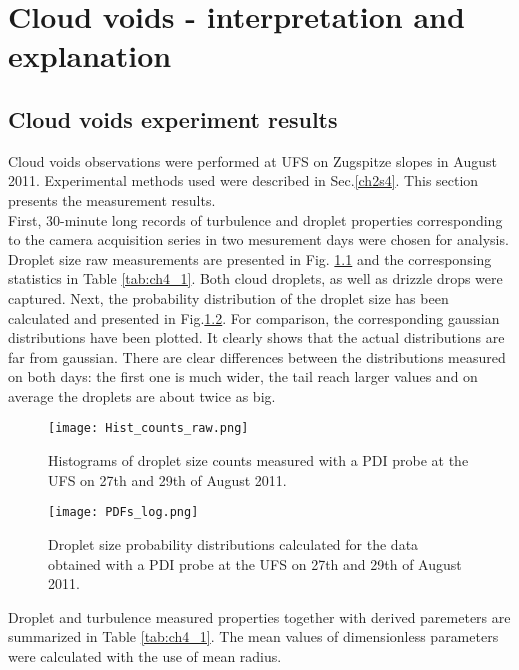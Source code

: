 \documentclass[../main.tex]{subfiles}
\begin{document}
\chapter{Cloud voids - interpretation and explanation} %

\label{ch:holes} %

\section{Cloud voids experiment results}
Cloud voids observations were performed at UFS on Zugspitze slopes in August 2011. Experimental methods used were described in Sec.\autoref{ch2s4}. This section presents the measurement results.\\
First, 30-minute long records of turbulence and droplet properties corresponding to the camera acquisition series in two mesurement days were chosen for analysis. Droplet size raw measurements are presented in Fig. \ref{fig:ch4_1} and the corresponsing statistics in Table \ref{tab:ch4_1}. Both cloud droplets, as well as drizzle drops were captured. Next, the probability distribution of the droplet size has been calculated and presented in Fig.\ref{fig:ch4_2}. For comparison, the corresponding gaussian distributions have been plotted. It clearly shows that the actual distributions are far from gaussian. There are clear differences between the distributions measured on both days: the first one is much wider, the tail reach larger values and on average the droplets are about twice as big.

\begin{figure}[h]
\centering
\noindent\texttt{[image: Hist\_counts\_raw.png]}
\caption{Histograms of droplet size counts measured with a PDI probe at the UFS on 27th and 29th of August 2011.}
\label{fig:ch4_1}
\end{figure}

\begin{figure}[h]
\centering
\noindent\texttt{[image: PDFs\_log.png]}
\caption{Droplet size probability distributions calculated for the data obtained with a PDI probe at the UFS on 27th and 29th of August 2011.}
\label{fig:ch4_2}
\end{figure}

Droplet and turbulence measured properties together with derived paremeters are summarized in Table \ref{tab:ch4_1}. The mean values of dimensionless parameters were calculated with the use of mean radius.
\end{document}

